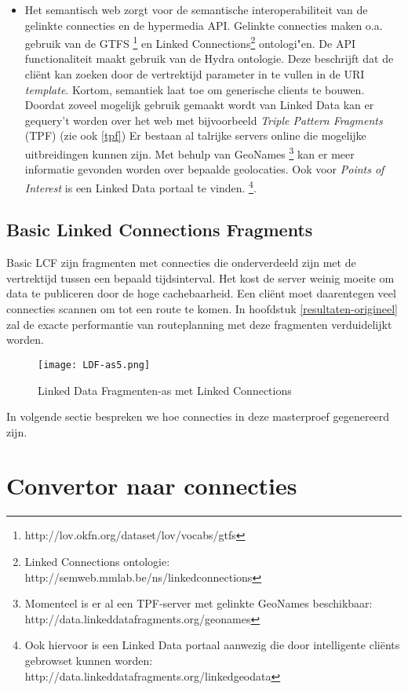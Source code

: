 \begin{itemize}
\item Het semantisch web zorgt voor de semantische interoperabiliteit van de gelinkte connecties en de hypermedia API. Gelinkte connecties maken o.a. gebruik van de GTFS \footnote{http://lov.okfn.org/dataset/lov/vocabs/gtfs} en Linked Connections\footnote{Linked Connections ontologie: http://semweb.mmlab.be/ns/linkedconnections} ontologi"en. De API functionaliteit maakt gebruik van de Hydra ontologie. Deze beschrijft dat de cli\"ent kan zoeken door de vertrektijd parameter in te vullen in de URI \textit{template}. Kortom, semantiek laat toe om generische clients te bouwen. 
Doordat zoveel mogelijk gebruik gemaakt wordt van Linked Data kan er gequery't worden over het web met bijvoorbeeld \textit{Triple Pattern Fragments} (TPF) (zie ook \ref{tpf}) Er bestaan al talrijke servers online die mogelijke uitbreidingen kunnen zijn. Met behulp van GeoNames \footnote{Momenteel is er al een TPF-server met gelinkte GeoNames beschikbaar: http://data.linkeddatafragments.org/geonames} kan er meer informatie gevonden worden over bepaalde geolocaties. Ook voor \textit{Points of Interest} is een Linked Data portaal te vinden. \footnote{Ook hiervoor is een Linked Data portaal aanwezig die door intelligente cli\"ents gebrowset kunnen worden: http://data.linkeddatafragments.org/linkedgeodata}.
\end{itemize}

\subsection{Basic Linked Connections Fragments}
\label{blcf}
Basic LCF zijn fragmenten met connecties die onderverdeeld zijn met de vertrektijd tussen een bepaald tijdsinterval. Het kost de server weinig moeite om data te publiceren door de hoge cachebaarheid. Een cli\"ent moet daarentegen veel connecties scannen om tot een route te komen. In hoofdstuk \ref{resultaten-origineel} zal de exacte performantie van routeplanning met deze fragmenten verduidelijkt worden.

\begin{figure}[h!]
\centering
\texttt{[image: LDF-as5.png]}
\caption{Linked Data Fragmenten-as met Linked Connections}
\label{ldf-lc5}
\end{figure}

In volgende sectie bespreken we hoe connecties in deze masterproef gegenereerd zijn.

\section{Convertor naar connecties}

